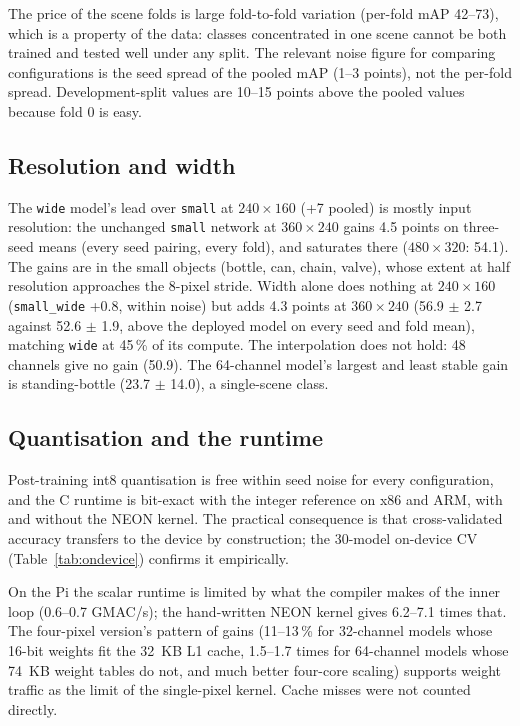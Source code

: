 \documentclass[11pt,a4paper]{article}
\newcommand{\cfg}[1]{\texttt{#1}}
\begin{document}
The price of the scene folds is large fold-to-fold variation (per-fold mAP
42--73), which is a property of the data: classes concentrated in one scene
cannot be both trained and tested well under any split. The relevant noise
figure for comparing configurations is the seed spread of the pooled mAP
(1--3 points), not the per-fold spread. Development-split values are 10--15
points above the pooled values because fold 0 is easy.

\subsection{Resolution and width}

The \cfg{wide} model's lead over \cfg{small} at $240 \times 160$ (+7 pooled)
is mostly input resolution: the unchanged \cfg{small} network at
$360 \times 240$ gains 4.5 points on three-seed means (every seed pairing,
every fold), and saturates there ($480 \times 320$: 54.1). The gains are in
the small objects (bottle, can, chain, valve), whose extent at half
resolution approaches the 8-pixel stride. Width alone does nothing at
$240 \times 160$ (\cfg{small\_wide} +0.8, within noise) but adds 4.3 points
at $360 \times 240$ (56.9 $\pm$ 2.7 against 52.6 $\pm$ 1.9, above the
deployed model on every seed and fold mean), matching \cfg{wide} at 45\,\%
of its compute. The interpolation does not hold: 48 channels give no gain
(50.9). The 64-channel model's largest and least stable gain is
standing-bottle (23.7 $\pm$ 14.0), a single-scene class.

\subsection{Quantisation and the runtime}

Post-training int8 quantisation is free within seed noise for every
configuration, and the C runtime is bit-exact with the integer reference on
x86 and ARM, with and without the NEON kernel. The practical consequence is
that cross-validated accuracy transfers to the device by construction; the
30-model on-device CV (Table~\ref{tab:ondevice}) confirms it empirically.

On the Pi the scalar runtime is limited by what the compiler makes of the
inner loop (0.6--0.7 GMAC/s); the hand-written NEON kernel gives 6.2--7.1
times that. The four-pixel version's pattern of gains (11--13\,\% for
32-channel models whose 16-bit weights fit the 32~KB L1 cache, 1.5--1.7
times for 64-channel models whose 74~KB weight tables do not, and much better
four-core scaling) supports weight traffic as the limit of the single-pixel
kernel. Cache misses were not counted directly.
\end{document}
